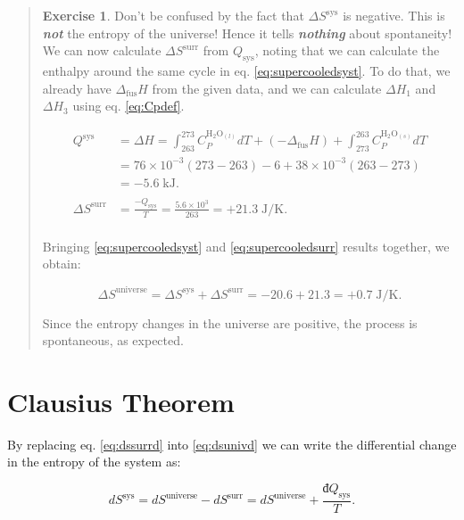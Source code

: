 \documentclass[
  9pt,
]{extbook}
\theoremstyle{definition}
\theoremstyle{definition}
\theoremstyle{definition}
\newtheorem{exercise}{Exercise}[chapter]
\theoremstyle{definition}
\theoremstyle{remark}
\begin{document}
\begin{quote}
\begin{exercise}
Don't be confused by the fact that \(\Delta S^{\text{sys}}\) is negative. This is \textbf{\emph{not}} the entropy of the universe! Hence it tells \textbf{\emph{nothing}} about spontaneity! We can now calculate \(\Delta S^{\text{surr}}\) from \(Q_{\text{sys}}\), noting that we can calculate the enthalpy around the same cycle in eq. \eqref{eq:supercooledsyst}. To do that, we already have \(\Delta_{\mathrm{fus}}H\) from the given data, and we can calculate \(\Delta H_1\) and \(\Delta H_3\) using eq. \eqref{eq:Cpdef}.

\begin{equation}
\begin{aligned}
Q^{\text{sys}} & = \Delta H = \int_{263}^{273} C_P^{\mathrm{H}_2 \mathrm{O}_{(l)}} dT + (-\Delta_{\mathrm{fus}}H) + \int_{273}^{263} C_P^{\mathrm{H}_2 \mathrm{O}_{(s)}}dT \\
& = 76 \times 10^{-3} (273-263) - 6 + 38  \times 10^{-3} (263-273) \\ &= -5.6 \; \text{kJ}. \\
\\
\Delta S^{\text{surr}} & = \frac{-Q_{\text{sys}}}{T}=\frac{5.6 \times 10^3}{263} = + 21.3 \; \text{J/K}. \\
\end{aligned}
\label{eq:supercooledsurr}
\end{equation}

Bringing \eqref{eq:supercooledsyst} and \eqref{eq:supercooledsurr} results together, we obtain:

\begin{equation}
\Delta S^{\text{universe}}=\Delta S^{\text{sys}} + \Delta S^{\text{surr}} =  -20.6+21.3=+0.7 \; \text{J/K}.
\label{eq:supercooledfinal}
\end{equation}

Since the entropy changes in the universe are positive, the process is spontaneous, as expected.
\end{exercise}
\end{quote}

\section{Clausius Theorem}\label{spontS}

By replacing eq. \eqref{eq:dssurrd} into \eqref{eq:dsunivd} we can write the differential change in the entropy of the system as:

\begin{equation}
d S^{\mathrm{sys}} = d S^{\mathrm{universe}} - d S^{\mathrm{surr}} = d S^{\mathrm{universe}} + \frac{đQ_{\text{sys}}}{T}.
\label{eq:dssysd}
\end{equation}
\end{document}
